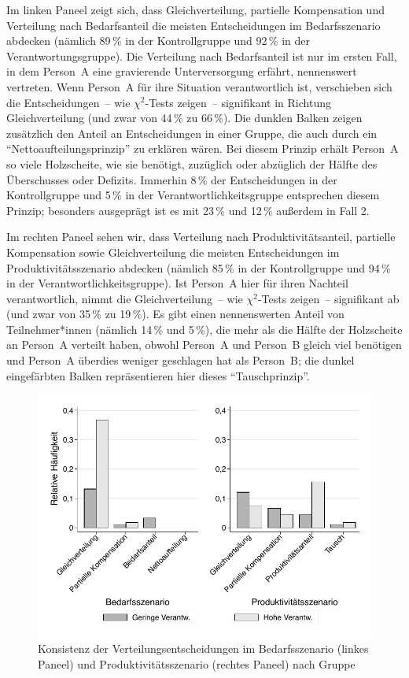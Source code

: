 \documentclass[justified,nobib,symmetric,twoside]{tufte-handout}
\begin{document}
Im linken Paneel zeigt sich, dass Gleichverteilung, partielle Kompensation und Verteilung nach Bedarfsanteil die meisten Entscheidungen im Bedarfsszenario abdecken (nämlich 89\,\% in der Kontrollgruppe und 92\,\% in der Verantwortungsgruppe).
Die Verteilung nach Bedarfsanteil ist nur im ersten Fall, in dem Person~A eine gravierende Unterversorgung erfährt, nennenswert vertreten.
Wenn Person~A für ihre Situation verantwortlich ist, verschieben sich die Entscheidungen~-- wie $\chi^{2}$-Tests zeigen~-- signifikant in Richtung Gleichverteilung (und zwar von 44\,\% zu 66\,\%).
Die dunklen Balken zeigen zusätzlich den Anteil an Entscheidungen in einer Gruppe, die auch durch ein \enquote{Nettoaufteilungsprinzip} zu erklären wären.
Bei diesem Prinzip erhält Person~A so viele Holzscheite, wie sie benötigt, zuzüglich oder abzüglich der Hälfte des Überschusses oder Defizits.
Immerhin 8\,\% der Entscheidungen in der Kontrollgruppe und 5\,\% in der Verantwortlichkeitsgruppe entsprechen diesem Prinzip; besonders ausgeprägt ist es mit 23\,\% und 12\,\% außerdem in Fall 2.

Im rechten Paneel sehen wir, dass Verteilung nach Produktivitätsanteil, partielle Kompensation sowie Gleichverteilung die meisten Entscheidungen im Produktivitätsszenario abdecken (nämlich 85\,\% in der Kontrollgruppe und 94\,\% in der Verantwortlichkeitsgruppe).
Ist Person~A hier für ihren Nachteil verantwortlich, nimmt die Gleichverteilung~-- wie $\chi^{\textrm{2}}$-Tests zeigen~-- signifikant ab (und zwar von 35\,\% zu 19\,\%).
Es gibt einen nennenswerten Anteil von Teilnehmer*innen (nämlich 14\,\% und 5\,\%), die mehr als die Hälfte der Holzscheite an Person~A verteilt haben, obwohl Person~A und Person~B gleich viel benötigen und Person~A überdies weniger geschlagen hat als Person~B; die dunkel eingefärbten Balken repräsentieren hier dieses \enquote{Tauschprinzip}.

\begin{figure}[t]\label{fig:abbildung_10}
   \center
   \caption{Konsistenz der Verteilungsentscheidungen im Bedarfsszenario (linkes Paneel)
und Produktivitätsszenario (rechtes Paneel) nach Gruppe}
   \includegraphics[width=0.99\linewidth]{figure_10.pdf}
\end{figure}
\end{document}
